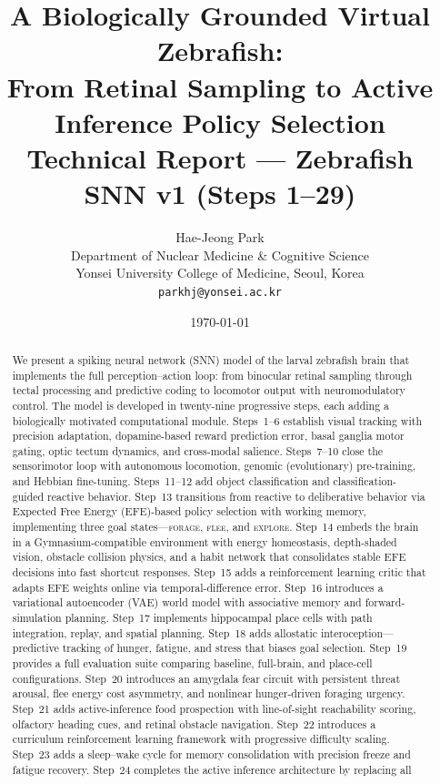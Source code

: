 \documentclass[11pt,a4paper]{article}
\title{%
  \textbf{A Biologically Grounded Virtual Zebrafish:\\
  From Retinal Sampling to Active Inference Policy Selection}\\[8pt]
  \large Technical Report --- Zebrafish SNN v1 (Steps 1--29)
}
\author{Hae-Jeong Park\\
  Department of Nuclear Medicine \& Cognitive Science\\
  Yonsei University College of Medicine, Seoul, Korea\\
  \texttt{parkhj@yonsei.ac.kr}
}
\date{\today}
\begin{document}
\maketitle

\begin{abstract}
We present a spiking neural network (SNN) model of the larval zebrafish brain
that implements the full perception--action loop: from binocular retinal
sampling through tectal processing and predictive coding to locomotor output
with neuromodulatory control.
The model is developed in twenty-nine progressive steps, each adding a
biologically motivated computational module.
Steps~1--6 establish visual tracking with precision adaptation, dopamine-based
reward prediction error, basal ganglia motor gating, optic tectum dynamics,
and cross-modal salience.
Steps~7--10 close the sensorimotor loop with autonomous locomotion,
genomic (evolutionary) pre-training, and Hebbian fine-tuning.
Steps~11--12 add object classification and classification-guided reactive
behavior.
Step~13 transitions from reactive to deliberative behavior via Expected Free
Energy (EFE)-based policy selection with working memory, implementing three
goal states---\textsc{forage}, \textsc{flee}, and \textsc{explore}.
Step~14 embeds the brain in a Gymnasium-compatible environment with energy
homeostasis, depth-shaded vision, obstacle collision physics, and a habit
network that consolidates stable EFE decisions into fast shortcut responses.
Step~15 adds a reinforcement learning critic that adapts EFE weights online
via temporal-difference error.
Step~16 introduces a variational autoencoder (VAE) world model with
associative memory and forward-simulation planning.
Step~17 implements hippocampal place cells with path integration, replay, and
spatial planning.
Step~18 adds allostatic interoception---predictive tracking of hunger,
fatigue, and stress that biases goal selection.
Step~19 provides a full evaluation suite comparing baseline, full-brain, and
place-cell configurations.
Step~20 introduces an amygdala fear circuit with persistent threat arousal,
flee energy cost asymmetry, and nonlinear hunger-driven foraging urgency.
Step~21 adds active-inference food prospection with line-of-sight
reachability scoring, olfactory heading cues, and retinal obstacle navigation.
Step~22 introduces a curriculum reinforcement learning framework with
progressive difficulty scaling.
Step~23 adds a sleep--wake cycle for memory consolidation with precision
freeze and fatigue recovery.
Step~24 completes the active inference architecture by replacing all

\end{abstract}
\end{document}
